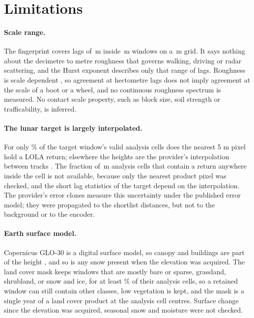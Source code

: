 \section{Limitations}
\label{sec:limitations}

\paragraph{Scale range.} The fingerprint covers lags of \ConfigLags\,m inside
\ConfigWindowM\,m windows on a \ConfigGridM\,m grid. It says nothing about the decimetre to metre
roughness that governs walking, driving or radar scattering, and the Hurst exponent describes only
that range of lags. Roughness is scale dependent \citep{shepard2001,kreslavsky2013}, so agreement
at hectometre lags does not imply agreement at the scale of a boot or a wheel, and no continuous
roughness spectrum is measured. No contact scale property, such as block size, soil strength or
trafficability, is inferred.

\paragraph{The lunar target is largely interpolated.} For only \MoonTargetObservedPct\% of the target window's valid analysis cells does the nearest 5 m pixel hold a LOLA return; elsewhere the heights are the provider's interpolation between
tracks \citep{barker2021}. The fraction of \ConfigGridM\,m analysis cells that contain a return
anywhere inside the cell is not available, because only the nearest product pixel was checked, and the
short lag statistics of the target depend on the interpolation. The
provider's error clones measure this uncertainty under the published error model; they were
propagated to the shortlist distances, but not to the background or to the encoder.

\paragraph{Earth surface model.} Copernicus GLO-30 is a digital surface model, so canopy and buildings are part of the height \citep{airbus2022copernicus}, and so is any snow present when the elevation was acquired. The land cover mask keeps windows that are mostly bare or sparse, grassland, shrubland, or snow and ice, for at least \ConfigMinAllowedPct\% of their analysis cells, so a retained window can still contain other classes, low vegetation is kept, and the mask is a single year of a land cover product at
the analysis cell centres. Surface change since the elevation was acquired, seasonal snow and
moisture were not checked.

